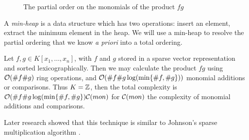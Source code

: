 \begin{figure}
    \center
    \caption{The partial order on the monomials of the product $fg$}
    \label{fig:ordering}
\end{figure}

A \textit{min-heap} is a data structure which has two operations: insert an element, extract the minimum element in the heap. We will use a min-heap to resolve the partial ordering that we know \textit{a priori} into a total ordering.

\begin{theorem}
    Let $f, g \in K[x_1, \ldots, x_n]$, with $f$ and $g$ stored in a sparse vector representation and sorted lexicographically.
    Then we may calculate the product $fg$ using $\mathcal O(\# f \# g)$ ring operations, and $\mathcal O(\# f \# g \log ( \min \{\# f, \# g\}))$ monomial additions or comparisons. Thus $K = {\mathbb Z}$, then the total complexity is $\mathcal O(\# f \# g \log ( \min \{\# f, \# g\})\mathcal C(mon)$ for $\mathcal C(mon)$ the complexity of monomial additions and comparisons.
\end{theorem}

Later research showed that this technique is similar to Johnson's sparse multiplication algorithm \cite{johnson-sparse-polynomial}.

